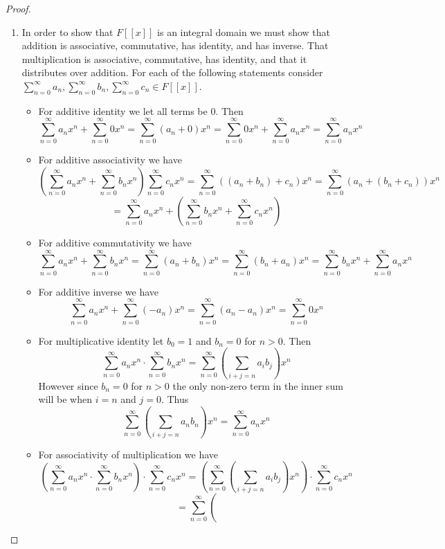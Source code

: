 \documentclass[10pt]{article}
\theoremstyle{plain}
\theoremstyle{remark}
\begin{document}
\begin{proof}
  \begin{enumerate}
  \item In order to show that $F[[x]]$ is an integral domain we
    must show that addition is associative, commutative, has identity,
    and has inverse. That multiplication is associative, commutative,
    has identity, and that it distributes
    over addition. For each of the following statements consider
    $\sum_{n=0}^\infty a_n,\sum_{n=0}^\infty b_n,\sum_{n=0}^\infty c_n\in F[[x]]$.
    \begin{itemize}
    \item For additive identity we let all terms be $0$. Then
      \[ \sum_{n=0}^\infty a_nx^n +\sum_{n=0}^\infty 0x^n=\sum_{n=0}^\infty (a_n+0)x^n=\sum_{n=0}^\infty 0x^n+\sum_{n=0}^\infty a_nx^n=
        \sum_{n=0}^\infty a_nx^n \]
    \item For additive associativity we have
      \[ \left(\sum_{n=0}^\infty a_nx^n + \sum_{n=0}^\infty b_nx^n\right) \sum_{n=0}^\infty c_nx^n
        = \sum_{n=0}^\infty ((a_n+b_n)+c_n)x^n=\sum_{n=0}^\infty (a_n+(b_n+c_n))x^n\]\[
        = \sum_{n=0}^\infty a_nx^n+\left(\sum_{n=0}^\infty b_nx^n+\sum_{n=0}^\infty c_nx^n\right)\]
    \item For additive commutativity we have
      \[ \sum_{n=0}^\infty a_nx^n + \sum_{n=0}^\infty b_nx^n=\sum_{n=0}^\infty (a_n+b_n)x^n
        = \sum_{n=0}^\infty (b_n+a_n)x^n=\sum_{n=0}^\infty b_nx^n+\sum_{n=0}^\infty a_nx^n\]
    \item For additive inverse we have
      \[ \sum_{n=0}^\infty a_nx^n + \sum_{n=0}^\infty (-a_n)x^n = \sum_{n=0}^\infty (a_n-a_n)x^n=
        \sum_{n=0}^\infty 0x^n \]
    \item For multiplicative identity let $b_0=1$ and $b_n=0$ for $n>0$. Then
      \[ \sum_{n=0}^\infty a_nx^n\cdot\sum_{n=0}^\infty b_nx^n=  \sum_{n=0}^\infty\left(\sum_{i+j=n}a_ib_j\right)x^n\]
      However since $b_n=0$ for $n>0$ the only non-zero term in the inner sum
      will be when $i=n$ and $j=0$. Thus
      \[ \sum_{n=0}^\infty\left(\sum_{i+j=n}a_nb_n\right)x^n=\sum_{n=0}^\infty a_nx^n \]
    \item For associativity of multiplication we have
      \[ 
        \left(
          \sum_{n=0}^\infty a_nx^n\cdot \sum_{n=0}^\infty b_nx^n
        \right)\cdot \sum_{n=0}^\infty c_nx^n
      = 
      \left(
        \sum_{n=0}^\infty 
        \left(
          \sum_{i+j=n}a_ib_j
        \right)x^n
      \right)\cdot \sum_{n=0}^\infty c_nx^n\]\[
      = \sum_{n=0}^\infty 
      \left(
\]
\end{itemize}
\end{enumerate}
\end{proof}
\end{document}

